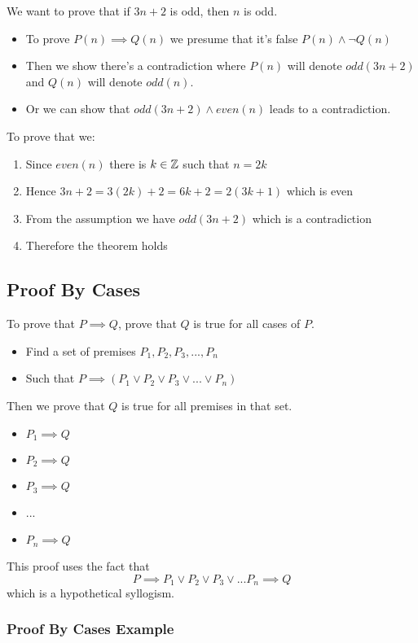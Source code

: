 We want to prove that if \(3n + 2\) is odd, then \(n\) is odd.
\begin{itemize}
    \item To prove \(P(n) \implies Q(n)\) we presume that it's false \(P(n) \land \neg Q(n)\)
    \item Then we show there's a contradiction where \(P(n)\) will denote \(odd(3n+2)\) and \(Q(n)\) will denote \(odd(n)\).
    \item Or we can show that \(odd(3n+2) \land even(n)\) leads to a contradiction.
\end{itemize}
To prove that we:
\begin{enumerate}
    \item Since \(even(n)\) there is \(k\in \mathbb{Z}\) such that \(n=2k\)
    \item Hence \(3n+2 = 3(2k)+2 = 6k + 2 = 2(3k+1)\) which is even
    \item From the assumption we have \(odd(3n+2)\) which is a contradiction
    \item Therefore the theorem holds
\end{enumerate}

\subsection{Proof By Cases}\label{sub:proof_by_cases}

To prove that \(P\implies Q\), prove that \(Q\) is true for all cases of \(P\).
\begin{itemize}
    \item Find a set of premises \(P_1, P_2, P_3, ..., P_n\)
    \item Such that \(P \implies (P_1 \lor P_2 \lor P_3 \lor ... \lor P_n)\)
\end{itemize}
Then we prove that \(Q\) is true for all premises in that set.
\begin{itemize}
    \item \(P_1 \implies Q\)
    \item \(P_2 \implies Q\)
    \item \(P_3 \implies Q\)
    \item ...
    \item \(P_n \implies Q\)
\end{itemize}
This proof uses the fact that
\[
    P \implies P_1 \lor P_2 \lor P_3 \lor ... P_n \implies Q
\]
which is a hypothetical syllogism.

\subsubsection{Proof By Cases Example}\label{ssub:proof_by_cases_example}

